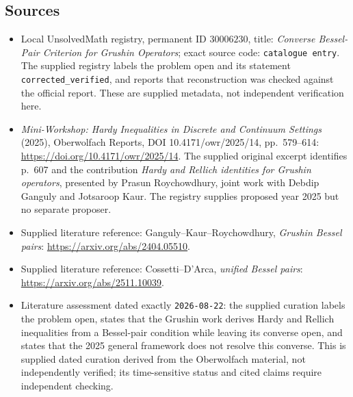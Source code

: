 \documentclass[11pt]{article}
\begin{document}
\subsection{Sources}
\begin{itemize}
\item Local UnsolvedMath registry, permanent ID \(30006230\), title: \emph{Converse Bessel-Pair Criterion for Grushin Operators}; exact source code: \texttt{catalogue entry}. The supplied registry labels the problem open and its statement \texttt{corrected\_verified}, and reports that reconstruction was checked against the official report. These are supplied metadata, not independent verification here.
\item \emph{Mini-Workshop: Hardy Inequalities in Discrete and Continuum Settings} (2025), Oberwolfach Reports, DOI 10.4171/owr/2025/14, pp.\ 579--614: \url{https://doi.org/10.4171/owr/2025/14}. The supplied original excerpt identifies p.\ 607 and the contribution \emph{Hardy and Rellich identities for Grushin operators}, presented by Prasun Roychowdhury, joint work with Debdip Ganguly and Jotsaroop Kaur. The registry supplies proposed year 2025 but no separate proposer.
\item Supplied literature reference: Ganguly--Kaur--Roychowdhury, \emph{Grushin Bessel pairs}: \url{https://arxiv.org/abs/2404.05510}.
\item Supplied literature reference: Cossetti--D'Arca, \emph{unified Bessel pairs}: \url{https://arxiv.org/abs/2511.10039}.
\item Literature assessment dated exactly \texttt{2026-08-22}: the supplied curation labels the problem open, states that the Grushin work derives Hardy and Rellich inequalities from a Bessel-pair condition while leaving its converse open, and states that the 2025 general framework does not resolve this converse. This is supplied dated curation derived from the Oberwolfach material, not independently verified; its time-sensitive status and cited claims require independent checking.
\end{itemize}
\end{document}
